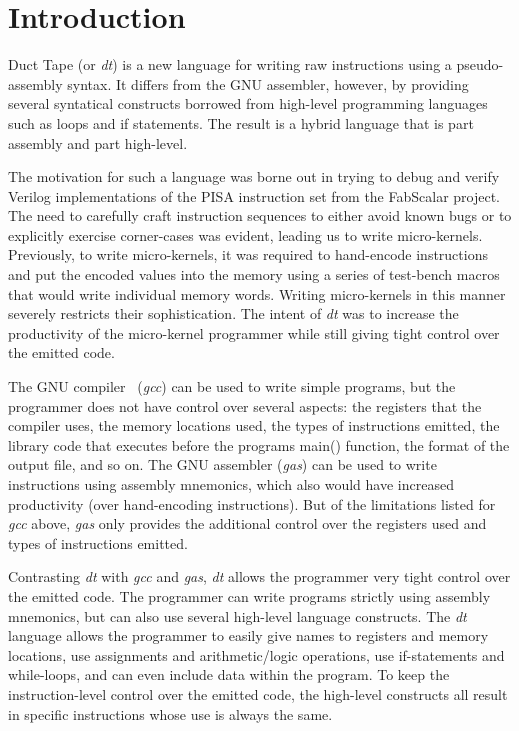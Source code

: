 \section{Introduction\label{sec:intro}}

Duct Tape (or \emph{dt}) is a new language for 
writing raw instructions using a 
pseudo-assembly syntax.  It differs from 
the GNU assembler, however, by providing 
several syntatical constructs borrowed from 
high-level programming languages such as 
loops and if statements.  The result is a 
hybrid language that is part assembly and 
part high-level.

The motivation for such a language was borne out 
in trying to debug and verify Verilog implementations
of the PISA instruction set from the FabScalar
project.  The need to carefully craft instruction
sequences to either avoid known bugs or to explicitly 
exercise corner-cases was evident, leading us to 
write micro-kernels.  Previously, to write micro-kernels, 
it was required to hand-encode instructions and 
put the encoded values into the memory using 
a series of test-bench macros that would write 
individual memory words. Writing micro-kernels 
in this manner severely restricts their sophistication.
The intent of \emph{dt} was to increase the 
productivity of the micro-kernel programmer 
while still giving tight control over the emitted 
code.

The GNU compiler~\cite{fsfgcc} (\emph{gcc}) can be used to 
write simple programs, but the programmer does not 
have control over several aspects: the registers 
that the compiler uses, the memory locations used, 
the types of instructions emitted, the library 
code that executes before the programs main() function, 
the format of the output file, 
and so on.  The GNU assembler (\emph{gas}) can be used to 
write instructions using assembly mnemonics, 
which also would have increased productivity 
(over hand-encoding instructions).  But of the 
limitations listed for \emph{gcc} above, \emph{gas}
only provides the additional control over the
registers used and types of instructions emitted.  

Contrasting \emph{dt} with \emph{gcc} and \emph{gas}, \emph{dt} allows 
the programmer very tight control over the emitted code. The
programmer can write programs strictly using assembly mnemonics, 
but can also use several high-level language constructs.  The 
\emph{dt} language allows the programmer to easily give 
names to registers and memory locations, use assignments and 
arithmetic/logic operations, use if-statements and while-loops, and 
can even include data within the program. To keep the 
instruction-level control over the emitted code, the high-level constructs
all result in specific instructions whose use is always the same.

